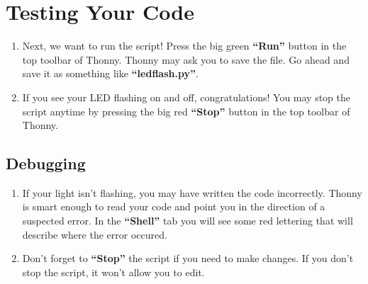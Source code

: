\documentclass{article}\usepackage[]{graphicx}\usepackage[]{color}
\begin{document}
\section{Testing Your Code}
\begin{enumerate}
\item Next, we want to run the script! Press the big green \textbf{``Run''} button in the top toolbar of Thonny. Thonny may ask you to save the file. Go ahead and save it as something like \textbf{``ledflash.py''}.
\item If you see your LED flashing on and off, congratulations! You may stop the script anytime by pressing the big red \textbf{``Stop''} button in the top toolbar of Thonny.
\end{enumerate}

\subsection{Debugging}
\begin{enumerate}
\item If your light isn't flashing, you may have written the code incorrectly. Thonny is smart enough to read your code and point you in the direction of a suspected error. In the \textbf{``Shell''} tab you will see some red lettering that will describe where the error occured.
\item Don't forget to \textbf{``Stop''} the script if you need to make changes. If you don't stop the script, it won't allow you to edit.
\end{enumerate}
\end{document}
